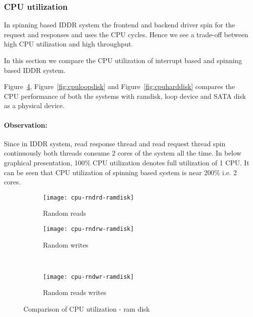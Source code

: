 \subsubsection*{CPU utilization}

In spinning based IDDR system the frontend and backend driver spin for the request and responses and uses the CPU cycles. Hence we see a trade-off between high CPU utilization and high throughput. 

In this section we compare the CPU utilization of interrupt based and spinning based IDDR system.

Figure~\ref{fig:cpuramdisk}, Figure~\ref{fig:cpuloopdisk} and Figure~\ref{fig:cpuharddisk} compares the CPU performance of both the systems with ramdisk, loop device and SATA disk as a physical device. 

\paragraph{Observation: }
Since in IDDR system, read response thread and read request thread spin continuously both threads consume 2 cores of the system all the time. In below graphical presentation, 100\% CPU utilization denotes full utilization of 1 CPU. It can be seen that CPU utilization of spinning based system is near 200\% i.e. 2 cores. 

\begin{figure}[!ht]
  \begin{subfigure}[b]{0.2\textwidth}
  \texttt{[image: cpu-rndrd-ramdisk]}
  \caption{Random reads}
  \label{subfig:cpu-rndrd-ramdisk}
  \end{subfigure}
  \hspace{50mm}
  \begin{subfigure}[b]{0.2\textwidth}
  \texttt{[image: cpu-rndrw-ramdisk]}
  \caption{Random writes}
  \label{subfig:cpu-rndrw-ramdisk}
  \end{subfigure}\\
  \begin{subfigure}[b]{0.3\textwidth}
  \texttt{[image: cpu-rndwr-ramdisk]}
  \caption{Random reads writes}
  \label{subfig:cpu-rndwr-ramdisk}
  \end{subfigure}
\caption{Comparison of CPU utilization - ram disk}\label{fig:cpuramdisk}
\end{figure}

